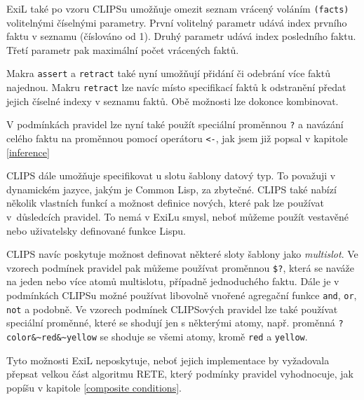 ExiL také po vzoru CLIPSu umožňuje omezit seznam vrácený voláním \verb|(facts)|
volitelnými číselnými parametry. První volitelný parametr udává index prvního
faktu v seznamu (číslováno od 1). Druhý parametr udává index posledního faktu.
Třetí parametr pak maximální počet vrácených faktů.

Makra \verb|assert| a \verb|retract| také nyní umožňují přidání či odebrání
více faktů najednou. Makru \verb|retract| lze navíc místo specifikací faktů k
odstranění předat jejich číselné indexy v seznamu faktů. Obě možnosti lze
dokonce kombinovat.

V podmínkách pravidel lze nyní také použít speciální proměnnou \verb|?| a
navázání celého faktu na proměnnou pomocí operátoru \verb|<-|, jak jsem již
popsal v kapitole \ref{inference}

CLIPS dále umožňuje specifikovat u slotu šablony datový typ. To považuji v
dynamickém jazyce, jakým je Common Lisp, za zbytečné. CLIPS také nabízí několik
vlastních funkcí a možnost definice nových, které pak lze používat v~důsledcích
pravidel. To nemá v ExiLu smysl, neboť můžeme použít vestavěné nebo uživatelsky
definované funkce Lispu.

CLIPS navíc poskytuje možnost definovat některé sloty šablony jako
\emph{multislot}. Ve vzorech podmínek pravidel pak můžeme používat proměnnou
\verb|$?|, která se naváže na jeden nebo více atomů multislotu, případně
jednoduchého faktu. Dále je v podmínkách CLIPSu možné používat libovolně vnořené
agregační funkce \verb|and|, \verb|or|, \verb|not| a podobně. Ve vzorech
podmínek CLIPSových pravidel lze také používat speciální proměnné, které se
shodují jen s některými atomy, např. proměnná \verb|?color&~red&~yellow| se
shoduje se všemi atomy, kromě \verb|red| a \verb|yellow|.

Tyto možnosti ExiL neposkytuje, neboť jejich implementace by vyžadovala přepsat
velkou část algoritmu RETE, který podmínky pravidel vyhodnocuje, jak popíšu v
kapitole \ref{composite conditions}.
